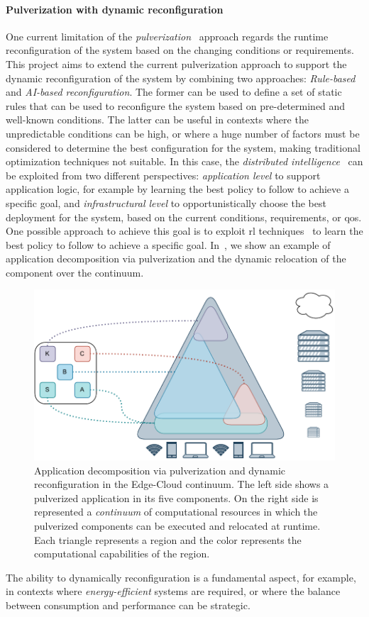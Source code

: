\documentclass[12pt,a4paper]{article}
\begin{document}
\paragraph{Pulverization with dynamic reconfiguration}\label{sec:pulv-dyn}
One current limitation of the \emph{pulverization}~\cite{DBLP:journals/fi/CasadeiPPVW20} approach regards the runtime reconfiguration of the system based on the changing conditions or requirements.
%
This project aims to extend the current pulverization approach to support the dynamic reconfiguration of the system
by combining two approaches: \emph{Rule-based} and \emph{AI-based reconfiguration}.
%
The former can be used to define a set of static rules that can be used to reconfigure the system based on pre-determined and well-known conditions.
%
The latter can be useful in contexts where the unpredictable conditions can be high,
or where a huge number of factors must be considered to determine the best configuration for the system,
making traditional optimization techniques not suitable.
%
In this case,
the \emph{distributed intelligence}~\cite{DBLP:journals/access/CampoloIM23} can be exploited from two different perspectives:
\emph{application level} to support application logic,
for example by learning the best policy to follow to achieve a specific goal,
and \emph{infrastructural level} to opportunistically choose the best deployment for the system,
based on the current conditions, requirements, or \ac{qos}.
%
One possible approach to achieve this goal is to exploit \ac{rl} techniques~\cite{DBLP:journals/computing/ShahidaniGHK23} to learn the best policy to follow to achieve a specific goal.
%
In~,
we show an example of application decomposition via pulverization and the dynamic relocation of the component over the continuum.
%
\begin{figure}[ht]
	\centering
	\includegraphics[width=0.6\linewidth]{img/phd-proposal.drawio.pdf}
	\caption{
		Application decomposition via pulverization and dynamic reconfiguration in the Edge-Cloud continuum.
		The left side shows a pulverized application in its five components.
		On the right side is represented a \emph{continuum} of computational resources in which the pulverized components can be executed and relocated at runtime.
		Each triangle represents a region and the color represents the computational capabilities of the region. 
		}
	\label{fig:ai-reconf}
\end{figure}
%
The ability to dynamically reconfiguration is a fundamental aspect,
for example,
in contexts where \emph{energy-efficient} systems are required,
or where the balance between consumption and performance can be strategic.
\end{document}
